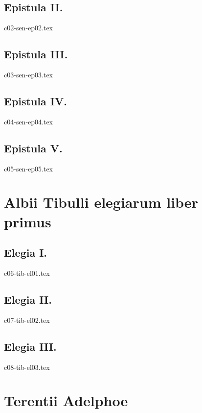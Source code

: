 \documentclass[a4paper,12pt,twoside]{report}
\begin{document}
\chapter{Epistula II.}

{c02-sen-ep02.tex}

\chapter{Epistula III.}

{c03-sen-ep03.tex}

\chapter{Epistula IV.}

{c04-sen-ep04.tex}

\chapter{Epistula V.}

{c05-sen-ep05.tex}

\part{Albii Tibulli elegiarum liber primus}

\chapter{Elegia I.}


{c06-tib-el01.tex}

\chapter{Elegia II.}


{c07-tib-el02.tex}

\chapter{Elegia III.}


{c08-tib-el03.tex}




\part{Terentii Adelphoe}
\end{document}
